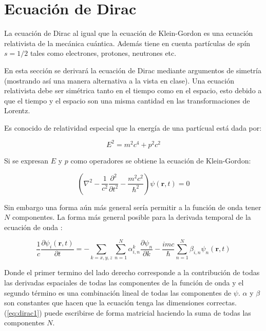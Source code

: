 \documentclass[a4paper, 12pt]{article} %
\begin{document}
\section{Ecuaci\'on de Dirac}
La ecuaci\'on de Dirac al igual que la ecuaci\'on de Klein-Gordon es una 
ecuaci\'on relativista de la mec\'anica cu\'antica. Adem\'as tiene en cuenta
part\'iculas de sp\'in $s=1/2$ tales como electrones, protones, neutrones etc. 

En esta secci\'on se derivar\'a la ecuaci\'on de Dirac mediante argumentos
de simetr\'ia (mostrando as\'i una manera alternativa a la vista en clase). 
Una ecuaci\'on relativista debe ser sim\'etrica tanto en el tiempo como en el 
espacio, esto debido a que el tiempo y el espacio son una misma cantidad 
en las transformaciones de Lorentz.

Es conocido de relatividad especial que la energ\'ia de una part\'icual est\'a dada
por:

\begin{equation}
E^2 = m^2c^4 + p^2c^2
\end{equation}

Si se expresan $E$ y $p$ como operadores se obtiene la ecuaci\'on de Klein-Gordon:

\begin{equation}
\left( \nabla^2 - \dfrac{1}{c^2}\dfrac{\partial^2}{\partial t^2} - \dfrac{m^2c^2}{\hbar^2}   \right)\psi(\mathbf{r}, t) = 0
\end{equation} 


Sin embargo una forma a\'un m\'as general ser\'ia permitir a la funci\'on de onda tener $N$ componentes. La forma m\'as 
general posible para la derivada temporal de la ecuaci\'on de onda \cite{dirac1,dirac2}:

\begin{equation}\label{eq:dirac1}
\dfrac{1}{c}\dfrac{\partial \psi_i(\mathbf{r},t)}{\partial t} =
- \sum \limits_{k=x,y,z} \sum \limits_{n=1}^{N}\alpha^k_{i,n} \dfrac{\partial \psi_n}{\partial k} -
\dfrac{imc}{\hbar}\sum \limits_{n=1}^{N}\beta_{i,n}\psi_n(\mathbf{r}, t)
\end{equation}

Donde el primer termino del lado derecho corresponde a la contribuci\'on 
de todas las derivadas espaciales de todas las componentes de la funci\'on 
de onda y el segundo t\'ermino es una combinaci\'on lineal de todas las 
componentes de $\psi$. $\alpha$ y $\beta$ son constantes que hacen que la 
ecuaci\'on tenga las dimensiones correctas. (\ref{eq:dirac1}) puede escribirse
de forma matricial haciendo la suma de todas las componentes $N$.   
\end{document}
